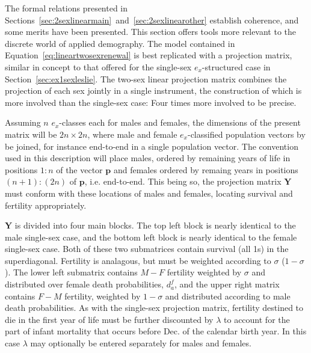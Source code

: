  \FloatBarrier
The formal relations presented in
Sections~\ref{sec:2sexlinearmain}~and~\ref{sec:2sexlinearother} establish
coherence, and some merits have been presented. This section offers tools
more relevant to the discrete world of applied demography. The model contained
in Equation~\ref{eq:lineartwosexrenewal} is best replicated with a projection
matrix, similar in concept to that offered for the single-sex $e_x$-structured
case in Section~\ref{sec:ex1sexleslie}. The two-sex linear projection matrix combines
the projection of each sex jointly in a single instrument, the construction of 
which is more involved than the single-sex case: Four times more involved to be precise. 

Assuming $n$ $e_x$-classes each for males and females, the dimensions of the
present matrix will be $2n \times 2n$, where male and female
$e_x$-classified population vectors by be joined, for instance end-to-end in a
single population vector. The convention used in this description will place
males, ordered by remaining years of life in positions $1:n$ of the vector
$\textbf{p}$ and females ordered by remaing years in positions $(n+1):(2n)$ of
$\textbf{p}$, i.e. end-to-end. This being so, the projection matrix $\textbf{Y}$
must conform with these locations of males and females, locating survival and 
fertility appropriately.

$\textbf{Y}$ is divided into four main blocks. The top left block is
nearly identical to the male single-sex case, and the bottom left block is
nearly identical to the female single-sex case. Both of these two submatrices
contain survival (all 1s) in the superdiagonal. Fertility is analagous, but must
be weighted according to $\sigma$ ($1-\sigma$). The lower left submatrix
contains $M-F$ fertility weighted by $\sigma$ and distributed over female death probabilities,
$d_a^f$, and the upper right matrix contains $F-M$ fertility, weighted by
$1-\sigma$ and distributed according to male death probabilities. As with the
single-sex projection matrix, fertility destined to die in the first year of
life must be further discounted by $\lambda$ to account for the part of infant
mortality that occurs before Dec.  of the calendar birth year. In this
case $\lambda$ may optionally be entered separately for males and females.

